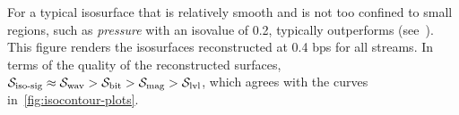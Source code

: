 For a typical isosurface that is relatively smooth and is not too confined to
small regions, such as \emph{pressure} with an isovalue of 0.2, \swav typically
outperforms \sbit (see~). This figure
renders the isosurfaces reconstructed at 0.4 bps for all streams. In terms of
the quality of the reconstructed surfaces, $\sisg \approx \swav > \sbit > \smag
> \slvl$, which agrees with the curves in~\autoref{fig:isocontour-plots}. 
